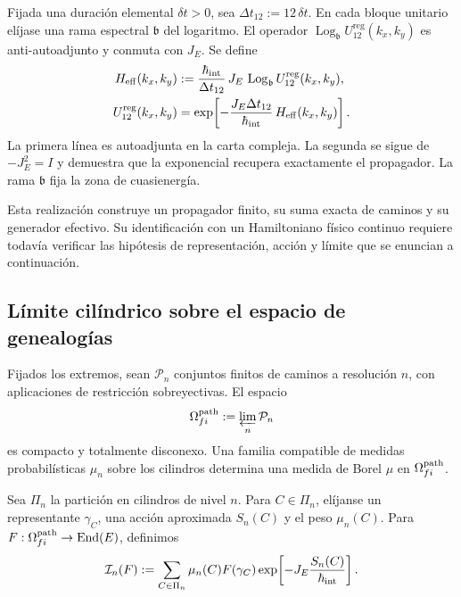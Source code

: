 Fijada una duración elemental \(\delta t>0\), sea
\(\Delta t_{12}:=12\,\delta t\). En cada bloque unitario elíjase una rama
espectral \(\mathfrak b\) del logaritmo. El operador
\(\operatorname{Log}_{\mathfrak b}U_{12}^{\mathrm{reg}}(k_x,k_y)\) es
anti-autoadjunto y conmuta con \(J_E\). Se define
\begin{equation}
 \begin{aligned}
 H_{\rm eff}(k_x,k_y)
 &:=
 \frac{\hbar_{\rm int}}{\Delta t_{12}}\,
 J_E\,
 \operatorname{Log}_{\mathfrak b}
 U_{12}^{\mathrm{reg}}(k_x,k_y),\\
 U_{12}^{\mathrm{reg}}(k_x,k_y)
 &=
 \exp\!\left[
  -\frac{J_E\Delta t_{12}}{\hbar_{\rm int}}\,
  H_{\rm eff}(k_x,k_y)
 \right].
 \end{aligned}
 \label{eq:hamiltoniano-efectivo-registro-27-rev3}
\end{equation}
La primera línea es autoadjunta en la carta compleja. La segunda se sigue de
\(-J_E^2=I\) y demuestra que la exponencial recupera exactamente el
propagador. La rama \(\mathfrak b\) fija la zona de cuasienergía.

Esta realización construye un propagador finito, su suma exacta de caminos y
su generador efectivo. Su identificación con un Hamiltoniano físico continuo
requiere todavía verificar las hipótesis de representación, acción y límite
que se enuncian a continuación.

\subsection{Límite cilíndrico sobre el espacio de genealogías}

Fijados los extremos, sean \(\mathcal P_n\) conjuntos finitos de caminos a
resolución \(n\), con aplicaciones de restricción sobreyectivas. El espacio
\[
 \Omega^{\rm path}_{fi}:=\varprojlim_n\mathcal P_n
\]
es compacto y totalmente disconexo. Una familia compatible de medidas
probabilísticas \(\mu_n\) sobre los cilindros determina una medida de Borel
\(\mu\) en \(\Omega^{\rm path}_{fi}\).

Sea \(\Pi_n\) la partición en cilindros de nivel \(n\). Para
\(C\in\Pi_n\), elíjanse un representante \(\gamma_C\), una acción aproximada
\(S_n(C)\) y el peso \(\mu_n(C)\). Para
\(F:\Omega^{\rm path}_{fi}\to\operatorname{End}(E)\), definimos
\begin{equation}
 \mathcal I_n(F)
 :=\sum_{C\in\Pi_n}\mu_n(C)F(\gamma_C)
 \exp\!\left[-J_E\frac{S_n(C)}{\hbar_{\rm int}}\right].
 \label{eq:integral-cilindrica-aproximante-rev2}
\end{equation}


